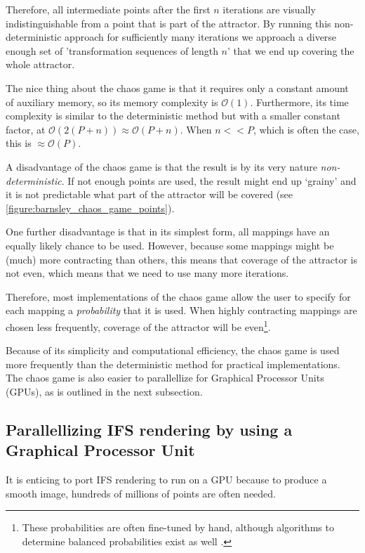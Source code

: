 \documentclass[11pt]{article}
\begin{document}
Therefore, all intermediate points after the first \(n\) iterations are visually indistinguishable from a point that is part of the attractor.
By running this non-deterministic approach for sufficiently many iterations we approach a diverse enough set of 'transformation sequences of length \(n\)' that we end up covering the whole attractor.

The nice thing about the chaos game is that it requires only a constant amount of auxiliary memory, so its memory complexity is \(\mathcal{O}(1)\).
Furthermore, its time complexity is similar to the deterministic method but with a smaller constant factor, at \(\mathcal{O}(2(P + n)) \approx \mathcal{O}(P + n)\). When \(n << P\), which is often the case, this is \(\approx \mathcal{O}(P)\).

A disadvantage of the chaos game is that the result is by its very nature \emph{non-deterministic}.
If not enough points are used, the result might end up `grainy' and it is not predictable what part of the attractor will be covered (see \autoref{figure:barnsley_chaos_game_points}).

One further disadvantage is that in its simplest form, all mappings have an equally likely chance to be used.
However, because some mappings might be (much) more contracting than others, this means that coverage of the attractor is not even,
which means that we need to use many more iterations.

Therefore, most implementations of the chaos game allow the user to specify for each mapping a \emph{probability} that it is used. 
When highly contracting mappings are chosen less frequently, coverage of the attractor will be even\footnote{These probabilities are often fine-tuned by hand, although algorithms to determine balanced probabilities exist as well \cite{hepting1991rendering}.}.

Because of its simplicity and computational efficiency, the chaos game is used more frequently than the deterministic method for practical implementations.
The chaos game is also easier to parallellize for Graphical Processor Units (GPUs), as is outlined in the next subsection.

\subsection{Parallellizing IFS rendering by using a Graphical Processor Unit}
\label{sec:org83088d0}

It is enticing to port IFS rendering to run on a GPU because to produce a smooth image, hundreds of millions of points are often needed.
\end{document}
